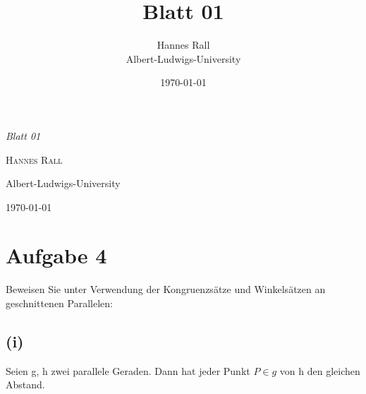 \documentclass[12pt,a4paper]{article}
\title{Blatt 01}
\author{Hannes Rall \\ Albert-Ludwigs-University}
\date{\today}
\begin{document}
 
\begin{titlepage}     
    \centering     
    \vspace*{2cm}     
    {\Huge\itshape Blatt 01\par}     
    \vspace{2cm}     
    {\Large\textsc{Hannes Rall}\par}     
    \vfill     
    {\large Albert-Ludwigs-University\\}     
    \vspace{1cm}     
    {\large\today\par}
\end{titlepage}

\newpage
\section*{Aufgabe 4}
Beweisen Sie unter Verwendung der Kongruenzsätze und Winkelsätzen an geschnittenen Parallelen:
\subsection*{(i)}
Seien g, h zwei parallele Geraden. Dann hat jeder Punkt $P\in g$ von h den gleichen Abstand.
\end{document}
